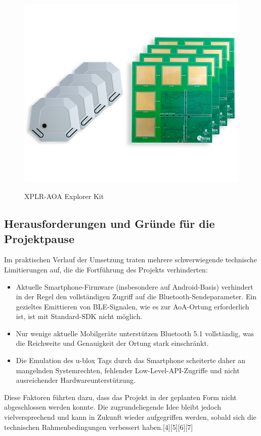 \documentclass[a4paper, 12pt]{article} %
\begin{document}
 \begin{figure}[H]
    \includegraphics[width=1\linewidth]{images/XPLR-AOA-with-C209-and-C211-02_0}\\[1ex]
    \centering
    \caption{XPLR-AOA Explorer Kit}
    \label{ABBILDUNG}
\end{figure}

 \subsection{Herausforderungen und Gründe für die Projektpause}
 Im praktischen Verlauf der Umsetzung traten mehrere schwerwiegende technische Limitierungen auf, die die Fortführung des Projekts verhinderten:

 \begin{itemize}
    \item Aktuelle Smartphone-Firmware (insbesondere auf Android-Basis) verhindert in der Regel den vollständigen Zugriff auf die Bluetooth-Sendeparameter. Ein gezieltes Emittieren von \acf{BLE}-Signalen, wie es zur \ac{AoA}-Ortung erforderlich ist, ist mit Standard-\acf{SDK} nicht möglich.
    \item Nur wenige aktuelle Mobilgeräte unterstützen Bluetooth 5.1 vollständig, was die Reichweite und Genauigkeit der Ortung stark einschränkt.
    \item Die Emulation des u-blox Tags durch das Smartphone scheiterte daher an mangelnden Systemrechten, fehlender Low-Level-\acf{API}-Zugriffe und nicht ausreichender Hardwareunterstützung.
 \end{itemize}
Diese Faktoren führten dazu, dass das Projekt in der geplanten Form nicht abgeschlossen werden konnte. 
Die zugrundeliegende Idee bleibt jedoch vielversprechend und kann in Zukunft wieder aufgegriffen werden, sobald sich 
die technischen Rahmenbedingungen verbessert haben.[4][5][6][7]
\end{document}
